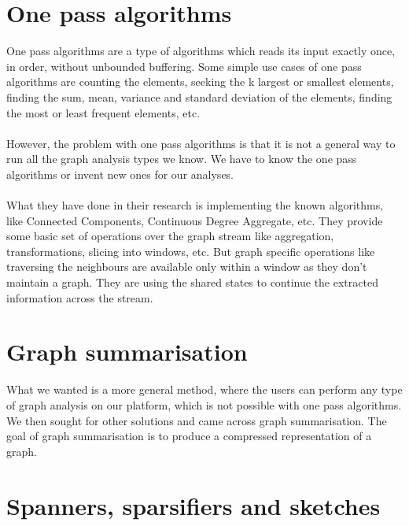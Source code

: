 \documentclass[12pt]{report}
\numberwithin{figure}{section}
\numberwithin{table}{section}
\begin{document}
\section{One pass algorithms}

One pass algorithms are a type of algorithms which reads its input exactly once, in order, without unbounded buffering. Some simple use cases of one pass algorithms are counting the elements, seeking the k largest or smallest elements, finding the sum, mean, variance and standard deviation of the elements, finding the most or least frequent elements, etc. 

\paragraph{}

However, the problem with one pass algorithms is that it is not a general way to run all the graph analysis types we know. We have to know the one pass algorithms or invent new ones for our analyses. 

\paragraph{}

What they have done in their research is implementing the known algorithms, like Connected Components, Continuous Degree Aggregate, etc. They provide some basic set of operations over the graph stream like aggregation, transformations, slicing into windows, etc. But graph specific operations like traversing the neighbours are available only within a window as they don’t maintain a graph. They are using the shared states to continue the extracted information across the stream.

\section{Graph summarisation}

What we wanted is a more general method, where the users can perform any type of graph analysis on our platform, which is not possible with one pass algorithms. We then sought for other solutions and came across graph summarisation. The goal of graph summarisation is to produce a compressed representation of a graph. 

\section{Spanners, sparsifiers and sketches}
\end{document}
